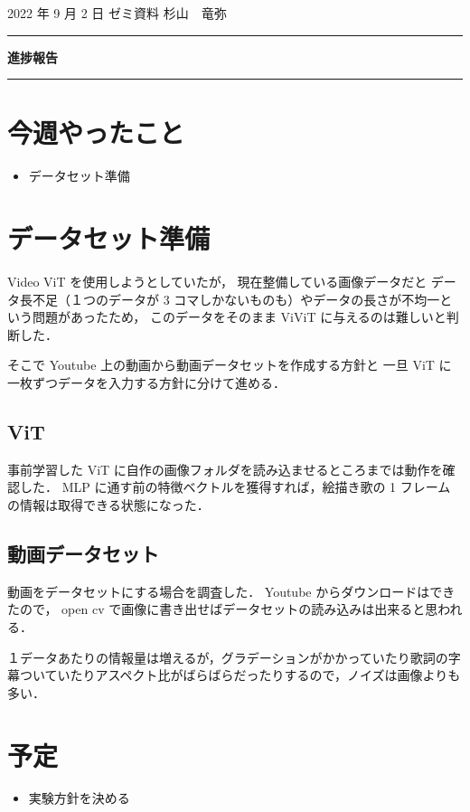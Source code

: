 \documentclass[onecolumn]{ujarticle}   %
\begin{document}

		\noindent
		\hspace{1em}
		2022 年 9 月 2 日
		ゼミ資料
		\hfill
		杉山　竜弥
		\vspace{2mm}

		\hrule
		\begin{center}
			{\Large \bf 進捗報告}
		\end{center}
		\hrule
		\vspace{9mm}


\section{今週やったこと}
\begin{itemize}
  \item データセット準備
\end{itemize}


\section{データセット準備}
Video ViT を使用しようとしていたが，
現在整備している画像データだと
データ長不足（１つのデータが 3 コマしかないものも）やデータの長さが不均一という問題があったため，
このデータをそのまま ViViT に与えるのは難しいと判断した．

そこで Youtube 上の動画から動画データセットを作成する方針と
一旦 ViT に一枚ずつデータを入力する方針に分けて進める．

\subsection{ViT}
事前学習した ViT に自作の画像フォルダを読み込ませるところまでは動作を確認した．
MLP に通す前の特徴ベクトルを獲得すれば，絵描き歌の 1 フレームの情報は取得できる状態になった．

\subsection{動画データセット}
動画をデータセットにする場合を調査した．
Youtube からダウンロードはできたので，
open cv で画像に書き出せばデータセットの読み込みは出来ると思われる．

１データあたりの情報量は増えるが，グラデーションがかかっていたり歌詞の字幕ついていたりアスペクト比がばらばらだったりするので，ノイズは画像よりも多い．

\section{予定}
\begin{itemize}
  \item 実験方針を決める
\end{itemize}



% 
% 
\end{document}
